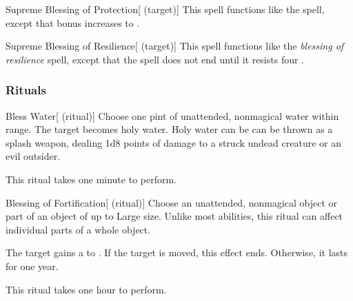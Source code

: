 \lowercase{\hypertarget{spell:Supreme Blessing of Protection}{}}\label{spell:Supreme Blessing of Protection}
\begin{attuneability}[\nth{7}]{\hypertarget{spell:Supreme Blessing of Protection}{Supreme Blessing of Protection}}[ (target)]
This spell functions like the  spell, except that bonus increases to .
\end{attuneability}
\vspace{0.25em}



\lowercase{\hypertarget{spell:Supreme Blessing of Resilience}{}}\label{spell:Supreme Blessing of Resilience}
\begin{attuneability}[\nth{7}]{\hypertarget{spell:Supreme Blessing of Resilience}{Supreme Blessing of Resilience}}[ (target)]
This spell functions like the \textit{blessing of resilience} spell, except that the spell does not end until it resists four .
\end{attuneability}
\vspace{0.25em}



\subsubsection{Rituals}


\lowercase{\hypertarget{spell:Bless Water}{}}\label{spell:Bless Water}
\begin{attuneability}[\nth{1}]{\hypertarget{spell:Bless Water}{Bless Water}}[ (ritual)]
Choose one pint of unattended, nonmagical water within \rngclose range.
The target becomes holy water.
Holy water can be can be thrown as a splash weapon, dealing 1d8 points of damage to a struck undead creature or an evil outsider.

This ritual takes one minute to perform.
\end{attuneability}
\vspace{0.25em}



\lowercase{\hypertarget{spell:Blessing of Fortification}{}}\label{spell:Blessing of Fortification}
\begin{attuneability}[\nth{1}]{\hypertarget{spell:Blessing of Fortification}{Blessing of Fortification}}[ (ritual)]
Choose an unattended, nonmagical object or part of an object of up to Large size.
Unlike most abilities, this ritual can affect individual parts of a whole object.

The target gains a   to .
If the target is moved, this effect ends.
Otherwise, it lasts for one year.

This ritual takes one hour to perform.
\end{attuneability}
\vspace{0.25em}



